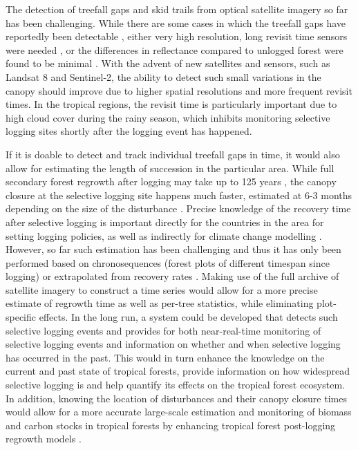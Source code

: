 \documentclass[a4paper,12pt]{scrbook}
\begin{document}
The detection of treefall gaps and skid trails from optical satellite imagery so far has been challenging. While there are some cases in which the treefall gaps have reportedly been detectable \citep{frolking_forest_2009}, either very high resolution, long revisit time sensors were needed \citep{read_spatial_2003}, or the differences in reflectance compared to unlogged forest were found to be minimal \citep{asner_canopy_2004, broadbent_recovery_2006}. With the advent of new satellites and sensors, such as Landsat 8 and Sentinel-2, the ability to detect such small variations in the canopy should improve due to higher spatial resolutions and more frequent revisit times. In the tropical regions, the revisit time is particularly important due to high cloud cover during the rainy season, which inhibits monitoring selective logging sites shortly after the logging event has happened.

If it is doable to detect and track individual treefall gaps in time, it would also allow for estimating the length of succession in the particular area. While full secondary forest regrowth after logging may take up to 125 years \citep{rutishauser_tree_2016}, the canopy closure at the selective logging site happens much faster, estimated at 6-3 months depending on the size of the disturbance \citep{broadbent_recovery_2006}. Precise knowledge of the recovery time after selective logging is important directly for the countries in the area for setting logging policies, as well as indirectly for climate change modelling \citep{rutishauser_rapid_2015}. However, so far such estimation has been challenging \citep{piponiot_carbon_2016} and thus it has only been performed based on chronosequences (forest plots of different timespan since logging) \citep{broadbent_recovery_2006} or extrapolated from recovery rates \citep{rutishauser_rapid_2015}. Making use of the full archive of satellite imagery to construct a time series would allow for a more precise estimate of regrowth time as well as per-tree statistics, while eliminating plot-specific effects. In the long run, a system could be developed that detects such selective logging events and provides for both near-real-time monitoring of selective logging events and information on whether and when selective logging has occurred in the past. This would in turn enhance the knowledge on the current and past state of tropical forests, provide information on how widespread selective logging is and help quantify its effects on the tropical forest ecosystem. In addition, knowing the location of disturbances and their canopy closure times would allow for a more accurate large-scale estimation and monitoring of biomass and carbon stocks in tropical forests by enhancing tropical forest post-logging regrowth models \citep{herault_growth_2010}.
\end{document}
